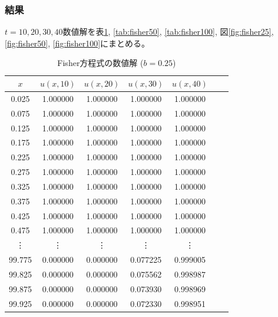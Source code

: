 \documentclass[a4j, titlepage]{jsarticle}
\numberwithin{equation}{section}
\begin{document}
        \subsubsection{結果}
            $t = 10, 20, 30, 40$数値解を表\ref{tab:fisher25}, \ref{tab:fisher50}, \ref{tab:fisher100},
            図\ref{fig:fisher25}, \ref{fig:fisher50}, \ref{fig:fisher100}にまとめる。
            \begin{table}[h]
                \caption{Fisher方程式の数値解 ($b = 0.25$)}
                \label{tab:fisher25}
                \centering
                \begin{tabular}{ccccccc}
                    \hline
                    $x$ & $u(x, 10)$ & $u(x, 20)$ & $u(x, 30)$ & $u(x, 40)$
                    \\
                    \hline
                    \hline
                    0.025 & 1.000000 & 1.000000 & 1.000000 & 1.000000 \\
                    0.075 & 1.000000 & 1.000000 & 1.000000 & 1.000000 \\
                    0.125 & 1.000000 & 1.000000 & 1.000000 & 1.000000 \\
                    0.175 & 1.000000 & 1.000000 & 1.000000 & 1.000000 \\
                    0.225 & 1.000000 & 1.000000 & 1.000000 & 1.000000 \\
                    0.275 & 1.000000 & 1.000000 & 1.000000 & 1.000000 \\
                    0.325 & 1.000000 & 1.000000 & 1.000000 & 1.000000 \\
                    0.375 & 1.000000 & 1.000000 & 1.000000 & 1.000000 \\
                    0.425 & 1.000000 & 1.000000 & 1.000000 & 1.000000 \\
                    0.475 & 1.000000 & 1.000000 & 1.000000 & 1.000000 \\
                    \vdots & \vdots & \vdots & \vdots & \vdots \vspace{1mm} \\
                    99.775 & 0.000000 & 0.000000 & 0.077225 & 0.999005 \\
                    99.825 & 0.000000 & 0.000000 & 0.075562 & 0.998987 \\
                    99.875 & 0.000000 & 0.000000 & 0.073930 & 0.998969 \\
                    99.925 & 0.000000 & 0.000000 & 0.072330 & 0.998951 \\

\end{tabular}
\end{table}
\end{document}
